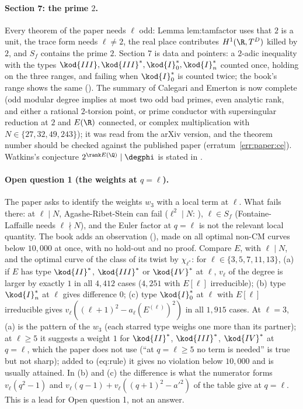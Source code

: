 \begin{sloppypar}
\paragraph{Section 7: the prime $2$.} Every theorem of the paper needs $\ell$ odd: Lemma lem:tamfactor uses that $2$ is a unit, the trace form needs $\ell\ne2$, the real place contributes
$H^1(\R,T^D)$ killed by $2$, and $S_f$ contains the prime $2$. Section 7 is data and pointers: a $2$-adic inequality with the types $\kod{III},\kod{III}^*,\kod{I}_0^*,\kod{I}_n^*$ counted once, holding on
the three ranges, and failing when $\kod{I}_0^*$ is counted twice; the book's range shows the same (). The summary of Calegari and Emerton \cite{CalegariEmerton09} is now
complete (odd modular degree implies at most two odd bad primes, even analytic rank, and either a rational $2$-torsion point, or prime conductor with supersingular reduction at $2$
and $E(\R)$ connected, or complex multiplication with $N\in\{27,32,49,243\}$); it was read from the arXiv version, and the theorem number should be checked against the published
paper (erratum~\ref{err:paper:ce}). Watkins's conjecture $2^{\rank E(\Q)}\mid\degphi$ is stated in .

\paragraph{Open question 1 (the weights at $q=\ell$).} The paper asks to identify the weights $w_3$ with a local term at $\ell$. What fails there: at $\ell\mid N$, Agashe-Ribet-Stein can fail
($\ell^2\mid N$: ), $\ell\in S_f$ (Fontaine-Laffaille needs $\ell\nmid N$), and the Euler factor at $q=\ell$ is not the relevant local quantity. The book adds an observation
(), made on all optimal non-CM curves below $10{,}000$ at once, with no hold-out and no proof. Compare $E$, with $\ell\mid N$, and the optimal curve of the class of its
twist by $\chi_{\ell^*}$: for $\ell\in\{3,5,7,11,13\}$, (a) if $E$ has type $\kod{II}^*$, $\kod{III}^*$ or $\kod{IV}^*$ at $\ell$, $v_\ell$ of the degree is larger by exactly $1$ in all $4{,}412$ cases ($4{,}251$ with
$E[\ell]$ irreducible); (b) type $\kod{I}_n^*$ at $\ell$ gives difference $0$; (c) type $\kod{I}_0^*$ at $\ell$ with $E[\ell]$ irreducible gives $v_\ell((\ell+1)^2-a_\ell(E^{(\ell)})^2)$ in all $1{,}915$ cases. At $\ell=3$,
(a) is the pattern of the $w_3$ (each starred type weighs one more than its partner); at $\ell\ge5$ it suggests a weight $1$ for $\kod{II}^*$, $\kod{III}^*$, $\kod{IV}^*$ at $q=\ell$, which the paper does not
use (``at $q=\ell\ge5$ no term is needed'' is true but not sharp); added to (eq:rule) it gives no violation below $10{,}000$ and is usually attained. In (b) and (c) the difference is what the
numerator forms $v_\ell(q^2-1)$ and $v_\ell(q-1)+v_\ell((q+1)^2-a'^2)$ of the table give at $q=\ell$. This is a lead for Open question 1, not an answer.


\end{sloppypar}
